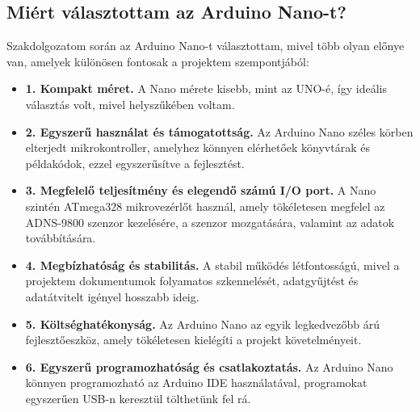 \documentclass[]{thesis-ekf}
\theoremstyle{definition}
\theoremstyle{remark}
\begin{document}
	\subsection{Miért választottam az Arduino Nano-t?}
	Szakdolgozatom során az Arduino Nano-t választottam, mivel több olyan előnye van, amelyek különösen fontosak a projektem szempontjából:
	
	\begin{itemize}
		\item \textbf{1. Kompakt méret.} A Nano mérete kisebb, mint az UNO-é, így ideális választás volt, mivel helyszűkében voltam.
		\item \textbf{2. Egyszerű használat és támogatottság.} Az Arduino Nano széles körben elterjedt mikrokontroller, amelyhez könnyen elérhetőek könyvtárak és példakódok, ezzel egyszerűsítve a fejlesztést.
		\item \textbf{3. Megfelelő teljesítmény és elegendő számú I/O port.} A Nano szintén ATmega328 mikrovezérlőt használ, amely tökéletesen megfelel az ADNS-9800 szenzor kezelésére, a szenzor mozgatására, valamint az adatok továbbítására.
		\item \textbf{4. Megbízhatóság és stabilitás.} A stabil működés létfontosságú, mivel a projektem dokumentumok folyamatos szkennelését, adatgyűjtést és adatátvitelt igényel hosszabb ideig.
		\item \textbf{5. Költséghatékonyság.} Az Arduino Nano az egyik legkedvezőbb árú fejlesztőeszköz, amely tökéletesen kielégíti a projekt követelményeit.
		\item \textbf{6. Egyszerű programozhatóság és csatlakoztatás.} Az Arduino Nano könnyen programozható az Arduino IDE használatával, programokat egyszerűen USB-n keresztül tölthetünk fel rá.
	\end{itemize}
\end{document}
